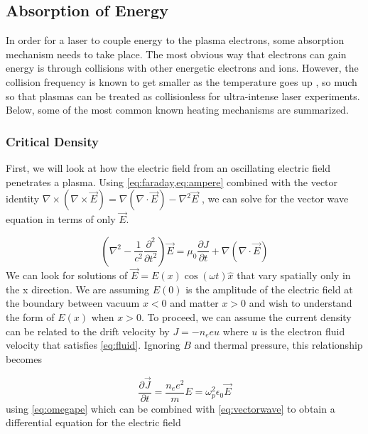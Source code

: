 \subsection{Absorption of Energy} \label{sec:absorption}

In order for a laser to couple energy to the plasma electrons, some absorption mechanism needs to take place. The most obvious way that electrons can gain energy is through collisions with other energetic electrons and ions. However, the collision frequency is known to get smaller as the temperature goes up \cite{Gibbon_2005_Plasma}, so much so that plasmas can be treated as collisionless for ultra-intense laser experiments. Below, some of the most common known heating mechanisms are summarized.

\subsubsection{Critical Density}
First, we will look at how the electric field from an oscillating electric field penetrates a plasma. Using \cref{eq:faraday,eq:ampere} combined with the vector identity $\nabla \times (\nabla \times \vec{E}) = \nabla(\nabla \cdot \vec{E}) - \nabla^2 \vec{E}$ \cite{Zangwill_2012}, we can solve for the vector wave equation in terms of only $\vec{E}$. 

\begin{equation}
	(\nabla^2 - \frac{1}{c^2} \frac{\partial^2}{\partial t^2}) \vec{E} = \mu_0 \frac{\partial J}{\partial t} + \nabla(\nabla \cdot \vec{E}) \label{eq:vectorwave}
\end{equation}
We can look for solutions of $\vec{E} = E(x) \cos(\omega t) \hat{x}$ that vary spatially only in the x direction. We are assuming $E(0)$ is the amplitude of the electric field at the boundary between vacuum $x < 0$ and matter $x > 0$ and wish to understand the form of $E(x)$ when $x > 0$. To proceed, we can assume the current density can be related to the drift velocity \cite{Macchi_2013_Plasma} by $J = -n_e e u$ where $u$ is the electron fluid velocity that satisfies \cref{eq:fluid}. Ignoring $B$ and thermal pressure, this relationship becomes 

\begin{equation}
	\frac{\partial \vec{J}}{\partial t} = \frac{n_e e^2}{m} E = \omega_p^2 \epsilon_0 \vec{E}
\end{equation}
using \cref{eq:omegape} which can be combined with \cref{eq:vectorwave} to obtain a differential equation for the electric field


